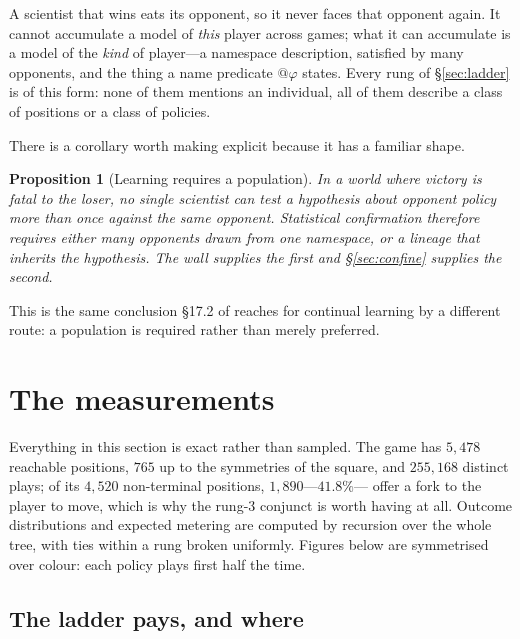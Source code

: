 \documentclass[11pt]{article}
\theoremstyle{definition}
\theoremstyle{plain}
\newtheorem{proposition}[definition]{Proposition}
\theoremstyle{remark}
\begin{document}
A scientist that wins eats its opponent, so it never faces that opponent again.
It cannot accumulate a model of \emph{this} player across games; what it can
accumulate is a model of the \emph{kind} of player---a namespace description,
satisfied by many opponents, and the thing a name predicate $@\varphi$ states.
Every rung of \S\ref{sec:ladder} is of this form: none of them mentions an
individual, all of them describe a class of positions or a class of policies.

There is a corollary worth making explicit because it has a familiar shape.

\begin{proposition}[Learning requires a population]
In a world where victory is fatal to the loser, no single scientist can test a
hypothesis about opponent policy more than once against the same opponent.
Statistical confirmation therefore requires either many opponents drawn from one
namespace, or a lineage that inherits the hypothesis. The wall supplies the
first and \S\ref{sec:confine} supplies the second.
\end{proposition}

This is the same conclusion \S17.2 of \cite{scientist} reaches for continual
learning by a different route: a population is required rather than merely
preferred.

\section{The measurements}\label{sec:measure}

Everything in this section is exact rather than sampled. The game has $5{,}478$
reachable positions, $765$ up to the symmetries of the square, and $255{,}168$
distinct plays; of its $4{,}520$ non-terminal positions, $1{,}890$---$41.8\%$---
offer a fork to the player to move, which is why the rung-3 conjunct is worth
having at all. Outcome distributions and expected metering are computed by
recursion over the whole tree, with ties within a rung broken uniformly.
Figures below are symmetrised over colour: each policy plays first half the
time.

\subsection{The ladder pays, and where}
\end{document}
